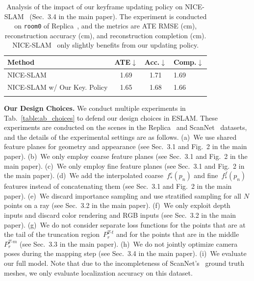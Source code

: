\begin{table}[t]
    \begin{center}
        \begin{tabular}{l|ccl}
            \Xhline{2\arrayrulewidth}
            \small Method & \small ATE$\downarrow$ & \small Acc.$\downarrow$ & \small Comp.$\downarrow$ \\

            \hline
            \small NICE-SLAM~\cite{zhu2022nice} & 1.69 & 1.71 & 1.69 \\
            \small NICE-SLAM w/ Our Key. Policy & 1.65 & 1.68 & 1.66 \\

            \Xhline{2\arrayrulewidth}
        \end{tabular}
    \end{center}
    \caption{Analysis of the impact of our keyframe updating policy on NICE-SLAM~\cite{zhu2022nice} (Sec.~3.4 in the main paper). The experiment is conducted on \texttt{room0} of Replica~\cite{replica19arxiv}, and the metrics are ATE RMSE (cm), reconstruction accuracy (cm), and reconstruction completion (cm). NICE-SLAM~\cite{zhu2022nice} only slightly benefits from our updating policy.}
    \label{table:ab_key}
\end{table}

\vspace{1ex}
\noindent\textbf{Our Design Choices.} We conduct multiple experiments in Tab.~\ref{table:ab_choices} to defend our design choices in ESLAM. These experiments are conducted on the scenes in the Replica~\cite{replica19arxiv} and ScanNet~\cite{dai2017scannet} datasets, and the details of the experimental settings are as follows. (a)~We use shared feature planes for geometry and appearance (see Sec.~3.1 and Fig.~2 in the main paper). (b)~We only employ coarse feature planes (see Sec.~3.1 and Fig.~2 in the main paper). (c)~We only employ fine feature planes (see Sec.~3.1 and Fig.~2 in the main paper). (d)~We add the interpolated coarse~$f^{c}_{*}(p_{n})$ and fine~$f^{f}_{*}(p_{n})$ features instead of concatenating them (see Sec.~3.1 and Fig.~2 in the main paper). (e)~We discard importance sampling and use stratified sampling for all $N$ points on a ray (see Sec.~3.2 in the main paper). (f)~We only exploit depth inputs and discard color rendering and RGB inputs (see Sec.~3.2 in the main paper). (g)~We do not consider separate loss functions for the points that are at the tail of the truncation region~$P_{r}^{T\text{-}t}$ and for the points that are in the middle~$P_{r}^{T\text{-}m}$ (see Sec.~3.3 in the main paper). (h)~We do not jointly optimize camera poses during the mapping step (see Sec.~3.4 in the main paper). (i)~We evaluate our full model. Note that due to the incompleteness of ScanNet's~\cite{dai2017scannet} ground truth meshes, we only evaluate localization accuracy on this dataset.

